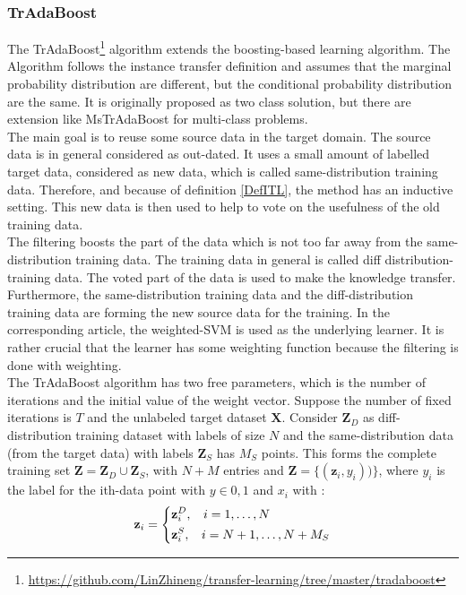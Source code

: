 \subsubsection{TrAdaBoost}
The TrAdaBoost\footnote{\url{https://github.com/LinZhineng/transfer-learning/tree/master/tradaboost}} algorithm extends the boosting-based learning algorithm.
The Algorithm follows the instance transfer definition and assumes that the marginal probability distribution are different, but the conditional probability distribution are the same.\cite{Dai.}
It is originally proposed as two class solution, but there are extension like MsTrAdaBoost for multi-class problems.\cite{Huang.2012}\\
The main goal is to reuse some source data in the target domain.
The source data is in general considered as out-dated.
It uses a small amount of labelled target data, considered as new data, which is called same-distribution training data.
Therefore, and because of definition \ref{DefITL}, the method has an inductive setting.
This new data is then used to help to vote on the usefulness of the old training data.\cite{Dai.}\\
The filtering boosts the part of the data which is not too far away from the same-distribution training data.
The training data in general is called diff distribution-training data.
The voted part of the data is used to make the knowledge transfer.
Furthermore, the same-distribution training data and the diff-distribution training data are forming the new source data for the training.
In the corresponding article, the weighted-\acs{SVM} is used as the underlying learner.
It is rather crucial that the learner has some weighting function because the filtering is done with weighting.\cite{Dai.}\\
The TrAdaBoost algorithm has two free parameters, which is the number of iterations and the initial value of the weight vector.
Suppose the number of fixed iterations is $T$ and the unlabeled target dataset $\mathbf{X}$.
Consider $\mathbf{Z}_D$ as diff-distribution training dataset with labels of size $N$ and the same-distribution data (from the target data) with labels $\mathbf{Z}_S$ has $M_S$ points.
This forms the complete training set $\mathbf{Z}=\mathbf{Z}_D\cup \mathbf{Z}_S$, with $N+M$ entries and $\mathbf{\mathbf{Z}}=\{(\mathbf{z}_i,y_i))\}$, where $y_i$ is the label for the ith-data point with $y\in {0,1}$ and $x_i$ with \cite{Dai.}:
\begin{equation*}
	\mathbf{z}_i = \begin{dcases}
						\mathbf{z}_i^D, \>\>\>\> i = 1,\dots,N\\
						\mathbf{z}_i^S, \>\>\>\> i = N +1,\dots,N+M_S
			  	   \end{dcases}
\end{equation*}
